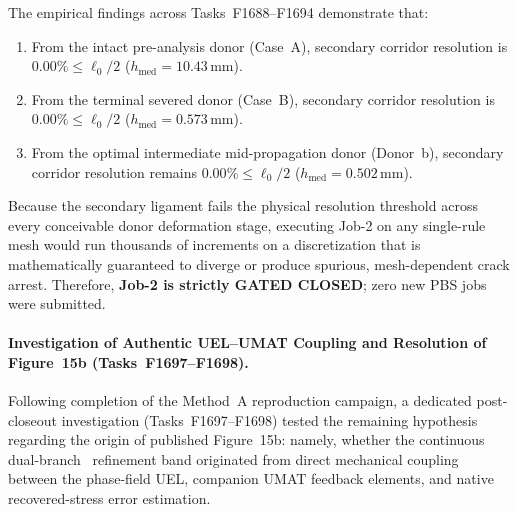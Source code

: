 The empirical findings across Tasks~F1688--F1694 demonstrate that:
\begin{enumerate}
  \item From the intact pre-analysis donor (Case~A), secondary corridor resolution is $0.00\% \le \ell_0/2$ ($h_{\mathrm{med}} = 10.43\,\mathrm{mm}$).
  \item From the terminal severed donor (Case~B), secondary corridor resolution is $0.00\% \le \ell_0/2$ ($h_{\mathrm{med}} = 0.573\,\mathrm{mm}$).
  \item From the optimal intermediate mid-propagation donor (Donor~b), secondary corridor resolution remains $0.00\% \le \ell_0/2$ ($h_{\mathrm{med}} = 0.502\,\mathrm{mm}$).
\end{enumerate}
Because the secondary ligament fails the physical resolution threshold across every conceivable donor deformation stage, executing Job-2 on any single-rule mesh would run thousands of increments on a discretization that is mathematically guaranteed to diverge or produce spurious, mesh-dependent crack arrest. Therefore, \textbf{Job-2 is strictly GATED CLOSED}; zero new PBS jobs were submitted.

\paragraph{Investigation of Authentic UEL--UMAT Coupling and Resolution of Figure~15b (Tasks~F1697--F1698).}
Following completion of the Method~A reproduction campaign, a dedicated post-closeout investigation (Tasks~F1697--F1698) tested the remaining hypothesis regarding the origin of published Figure~15b: namely, whether the continuous dual-branch \MISESERI\ refinement band originated from direct mechanical coupling between the phase-field UEL, companion UMAT feedback elements, and native \Abaqus recovered-stress error estimation.


